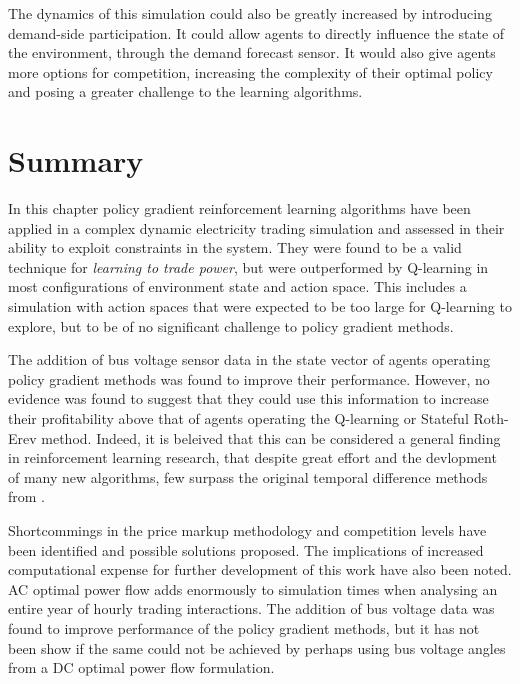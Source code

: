 The dynamics of this simulation could also be greatly increased by introducing
demand-side participation.  It could allow agents to directly influence the
state of the environment, through the demand forecast sensor.  It would
also give agents more options for competition, increasing the complexity of
their optimal policy and posing a greater challenge to the learning algorithms.

\section{Summary}
In this chapter policy gradient reinforcement learning algorithms have been
applied in a complex dynamic electricity trading simulation and assessed in
their ability to exploit constraints in the system.  They were found to be a
valid technique for \textit{learning to trade power}, but were outperformed by
Q-learning in most configurations of environment state and action space.  This
includes a simulation with action spaces that were expected to be too large for
Q-learning to explore, but to be of no significant challenge to policy gradient
methods.

The addition of bus voltage sensor data in the state vector of agents operating
policy gradient methods was found to improve their performance. However, no
evidence was found to suggest that they could use this information to increase
their profitability above that of agents operating the Q-learning or Stateful
Roth-Erev method.  Indeed, it is beleived that this can be considered a general
finding in reinforcement learning research, that despite great effort and the
devlopment of many new algorithms, few surpass the original temporal
difference methods from .

Shortcommings in the price markup methodology and competition levels have been
identified and possible solutions proposed.  The implications of increased
computational expense for further development of this work have also been noted.
AC optimal power flow adds enormously to simulation times when analysing an
entire year of hourly trading interactions.  The addition of bus voltage data
was found to improve performance of the policy gradient methods, but it has not
been show if the same could not be achieved by perhaps using bus voltage angles
from a DC optimal power flow formulation.
